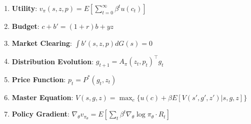 \documentclass[12pt,a4paper]{article}
\begin{document}
\begin{enumerate}
    \item \textbf{Utility}: $v_\pi(s,z,p) = E[\sum_{t=0}^\infty \beta^t u(c_t)]$
    \item \textbf{Budget}: $c + b' = (1+r)b + yz$
    \item \textbf{Market Clearing}: $\int b'(s,z,p) dG(s) = 0$
    \item \textbf{Distribution Evolution}: $g_{t+1} = A_\pi(z_t,p_t)^\top g_t$
    \item \textbf{Price Function}: $p_t = P^*(g_t, z_t)$
    \item \textbf{Master Equation}: $V(s,g,z) = \max_c \{u(c) + \beta E[V(s',g',z')|s,g,z]\}$
    \item \textbf{Policy Gradient}: $\nabla_\theta v_{\pi_\theta} = E[\sum_t \beta^t \nabla_\theta \log \pi_\theta \cdot R_t]$
\end{enumerate}
\end{document}
